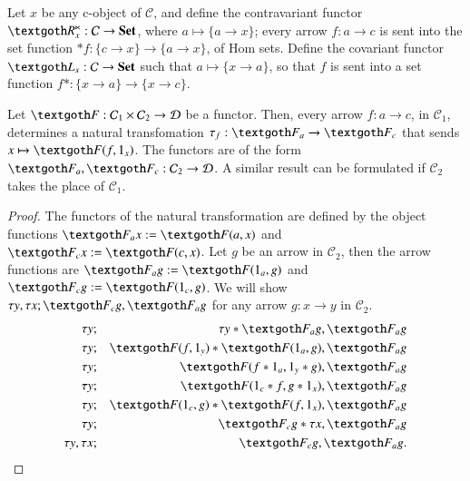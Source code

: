 \documentclass [12pt]{book}
\begin{document}
\begin{definition}Let $x$ be any c-object of $\mathcal C$, and define the contravariant functor $\textgoth R^{\ltimes}_x:\mathcal C\rightarrow\textbf{Set}$, where $a\mapsto\{a\rightarrow x\}$; every arrow $f:a\rightarrow c$ is sent into the set function $*f:\{c\rightarrow x\}\rightarrow\{a\rightarrow x\}$, of Hom sets. Define the covariant functor $\textgoth L_x:\mathcal C\rightarrow\textbf{Set}$ such that $a\mapsto\{x\rightarrow a\}$, so that $f$ is sent into a set function $f*:\{x\rightarrow a\}\rightarrow\{x\rightarrow c\}$.\end{definition}

\begin{lemma nat t1}Let $\textgoth F:\mathcal C_1\times\mathcal C_2\rightarrow\mathcal D$ be a functor. Then, every arrow $f:a\rightarrow c$, in $\mathcal C_1$, determines a natural transfomation $\tau_f:\textgoth F_a\rightarrow\textgoth F_c$ that sends $x\mapsto\textgoth F(f,1_x)$. The functors are of the form $\textgoth F_a,\textgoth F_c:\mathcal C_2\rightarrow\mathcal D$. A similar result can be formulated if $\mathcal C_2$ takes the place of $\mathcal C_1$.\end{lemma nat t1}

\begin{proof}The functors of the natural transformation are defined by the object functions $\textgoth F_ax:=\textgoth F(a,x)$ and $\textgoth F_cx:=\textgoth F(c,x)$. Let $g$ be an arrow in $\mathcal C_2$, then the arrow functions are $\textgoth F_ag:=\textgoth F(1_a,g)$ and $\textgoth F_cg:=\textgoth F(1_c,g)$. We will show $\tau y,\tau x;\textgoth F_cg,\textgoth F_ag$ for any arrow $g:x\rightarrow y$ in $\mathcal C_2$.\begin{eqnarray}\nonumber\tau y&;&\tau y*\textgoth F_ag,\textgoth F_ag\\\nonumber\tau y&;&\textgoth F(f,1_y)*\textgoth F(1_a,g),\textgoth F_ag\\\nonumber\tau y&;&\textgoth F(f*1_a,1_y*g),\textgoth F_ag\\\nonumber\tau y&;&\textgoth F(1_c*f,g*1_x),\textgoth F_ag\\\nonumber\tau y&;&\textgoth F(1_c,g)*\textgoth F(f,1_x),\textgoth F_ag\\\nonumber\tau y&;&\textgoth F_cg*\tau x,\textgoth F_ag\\\nonumber\tau y,\tau x&;&\textgoth F_cg,\textgoth F_ag.\end{eqnarray}\end{proof}
\end{document}
